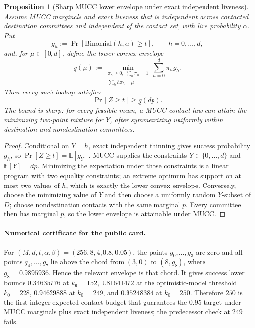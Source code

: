 \documentclass[11pt]{article}
\newtheorem{proposition}{Proposition}
\newcommand{\E}{\mathbb{E}}
\begin{document}
\begin{proposition}[Sharp MUCC lower envelope under exact independent liveness]
\label{prop:mucc-lower-envelope}
Assume MUCC marginals and exact liveness that is independent across contacted destination committees and independent of the contact set, with live probability $\alpha$.  Put
\[
 g_h:=\Pr[\mathrm{Binomial}(h,\alpha)\ge t],\qquad h=0,\ldots,d,
\]
and, for $\mu\in[0,d]$, define the lower convex envelope
\[
 \underline g(\mu):=
 \min_{\substack{\pi_h\ge0,\;\sum_h\pi_h=1\\
                   \sum_h h\pi_h=\mu}}
       \sum_{h=0}^{d}\pi_h g_h.
\]
Then every such lookup satisfies
\[
 \Pr[Z\ge t]\ge \underline g(dp).
\]
The bound is sharp: for every feasible mean, a MUCC contact law can attain the minimizing two-point mixture for $Y$, after symmetrizing uniformly within destination and nondestination committees.
\end{proposition}

\begin{proof}
Conditional on $Y=h$, exact independent thinning gives success probability $g_h$, so $\Pr[Z\ge t]=\E[g_Y]$.  MUCC supplies the constraints $Y\in\{0,\ldots,d\}$ and $\E[Y]=dp$.  Minimizing the expectation under those constraints is a linear program with two equality constraints; an extreme optimum has support on at most two values of $h$, which is exactly the lower convex envelope.  Conversely, choose the minimizing value of $Y$ and then choose a uniformly random $Y$-subset of $D$; choose nondestination contacts with the same marginal $p$.  Every committee then has marginal $p$, so the lower envelope is attainable under MUCC.
\end{proof}

\paragraph{Numerical certificate for the public card.}
For $(M,d,t,\alpha,\beta)=(256,8,4,0.8,0.05)$, the points $g_0,\ldots,g_3$ are zero and all points $g_4,\ldots,g_7$ lie above the chord from $(3,0)$ to $(8,g_8)$, where $g_8=0.9895936$.  Hence the relevant envelope is that chord.  It gives success lower bounds $0.34635776$ at $k_0=152$, $0.81641472$ at the optimistic-model threshold $k_0=228$, $0.94629888$ at $k_0=249$, and $0.95248384$ at $k_0=250$.  Therefore $250$ is the first integer expected-contact budget that guarantees the $0.95$ target under MUCC marginals plus exact independent liveness; the predecessor check at $249$ fails.
\end{document}
